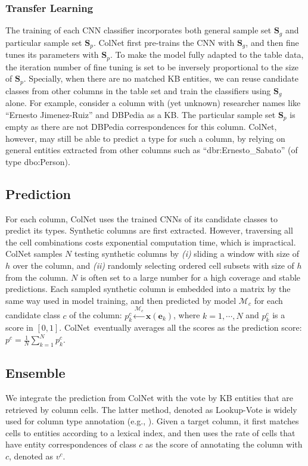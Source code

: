 \documentclass[letterpaper]{article}
\newcommand{\rv}[1]{{\color{black}#1}}
\newcommand{\camera}[1]{{\color{black}#1}}
\newcommand{\ColNet}{\textsf{ColNet}\xspace}
\begin{document}
\subsubsection{Transfer Learning}

The training of each CNN classifier \rv{incorporates both general sample set $\bm{S}_g$ and particular sample set $\bm{S}_p$.
\ColNet first pre-trains the CNN with $\bm{S}_g$,
and then fine tunes its parameters with $\bm{S}_p$.
To make the model fully adapted to the table data, 
the iteration number of fine tuning is set to be inversely proportional to the size of $\bm{S}_p$}.
\camera{Specially, when there are no matched KB entities,
we can reuse candidate classes from other columns in the table set and train the classifiers using $\bm{S}_g$ alone. 
For example, consider a column with (yet unknown) researcher names like ``Ernesto Jimenez-Ruiz'' and DBPedia as a KB. The particular sample set $\bm{S}_p$ is empty as there are not DBPedia correspondences for this column. \ColNet, however, may still be able to predict a type for such a column, by relying on general entities extracted from other columns such as ``dbr:Ernesto\_Sabato'' (of type dbo:Person).
}
\medskip
\subsection{\rv{Prediction}}

\rv{For each column,
\ColNet uses the trained CNNs of its candidate classes to predict its types.
Synthetic columns are first extracted.
However, traversing all the cell combinations}
costs exponential computation time,
which is impractical.
\ColNet samples $N$ testing synthetic columns
by \textit{(i)} sliding a window with size of $h$ over the column, and 
\textit{(ii)} randomly selecting ordered cell subsets with size of $h$ from the column.
$N$ is often set to a large number for a high coverage and stable predictions.
Each sampled synthetic column is embedded into a matrix by the same way used in model training,
and then predicted by model 
$\mathcal{M}_c$ for each candidate class $c$ of the column:
$p_k^c 
\xleftarrow{\mathcal{M}_c} 
\bm{x}(\bm{e}_{k})
$, where $k = 1,\cdots,N$ and $p_k^c$ is a score in $[0,1]$.
\ColNet~\rv{eventually averages all the scores as the prediction score:}
$
p^c = \frac{1}{N} \sum_{k=1}^N p_k^c
$.


\subsection{Ensemble}
\rv{
We integrate the prediction from \ColNet with the 
vote by KB entities that are retrieved by column cells.
The latter method, denoted as Lookup-Vote is widely used for column type annotation (e.g., \cite{zwicklbauer2013towards}).}
\rv{Given a target column,
it first matches cells to entities according to a lexical index,
and then uses the rate of cells that have entity correspondences of class $c$ as the score of annotating the column with $c$, denoted as $v^c$.
}
\end{document}
